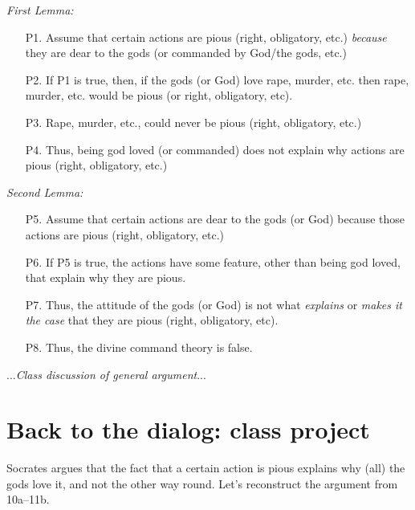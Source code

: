 \documentclass[oneside]{article}
\begin{document}
\noindent \emph{First Lemma:}

\begin{enumerate}
\item[P1.] Assume that certain actions are pious (right,  obligatory, etc.) \emph{because} they are dear to the gods (or commanded by God/the gods, etc.)
\item[P2.] If P1 is true, then, if the gods (or God) love rape, murder, etc. then rape, murder, etc. would be pious (or right, obligatory, etc). 
\item[P3.] Rape, murder, etc., could never be pious (right, obligatory, etc.) 
\item[P4.] Thus, being god loved (or commanded) does not explain why actions are pious (right, obligatory, etc.)
\end{enumerate}

\noindent \emph{Second Lemma:}
\begin{enumerate}
\item[P5.] Assume that certain actions are dear to the gods (or God) because those actions are pious (right, obligatory, etc.)
\item[P6.] If P5 is true, the actions have some feature, other than being god loved, that explain why they are pious. 
\item[P7.] Thus,  the attitude of the gods (or God) is not what \emph{explains} or \emph{makes it the case} that they are pious (right, obligatory, etc).
\item[P8.] Thus, the divine command theory is false.
\end{enumerate}
\noindent ...\emph{Class discussion of general argument}...

\section*{Back to the dialog: class project}
\noindent Socrates argues that the fact that a certain action is pious explains why (all) the gods love it, and not the other way round. Let's reconstruct the argument from 10a--11b. 

\end{document}
